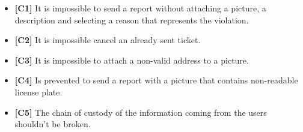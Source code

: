 \begin{itemize}
		\item \textbf{[\hypertarget{C1}{C1}]} It is impossible to send a report without attaching a picture, a description and selecting a reason that represents the violation. 
		\item \textbf{[\hypertarget{C2}{C2}]} It is impossible cancel an already sent ticket. 
		\item \textbf{[\hypertarget{C3}{C3}]} It is impossible to attach a non-valid address to a picture. %
		\item \textbf{[\hypertarget{C4}{C4}]} Is prevented to send a report with a picture that contains non-readable license plate. 
		\item \textbf{[\hypertarget{C5}{C5}]} The chain of custody of the information coming from the users shouldn't be broken. %
		
	\end{itemize}
